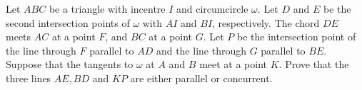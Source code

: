 Let 
$ABC$
 be a triangle with incentre 
$I$
 and circumcircle 
$\omega$.
 Let 
$D$
 and 
$E$
 be the second intersection points of 
$\omega$
 with 
$AI$
 and 
$BI$, 
 respectively. The chord 
$DE$
 meets 
$AC$
 at a point 
$F$, 
 and 
$BC$
 at a point 
$G$.
 Let 
$P$
 be the intersection point of the line through 
$F$
 parallel to 
$AD$
 and the line through 
$G$
 parallel to 
$BE$.
 Suppose that the tangents to 
$\omega$
 at 
$A$
 and 
$B$
 meet at a point 
$K$.
 Prove that the three lines 
$AE,BD$
 and 
$KP$
 are either parallel or concurrent.
